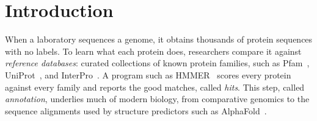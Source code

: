 \documentclass[letterpaper,twocolumn,10pt]{article}
\theoremstyle{definition}
\newcommand{\sys}{TARE\xspace}
\newcommand{\sys}{PARE\xspace}
\providecommand{\DIFadd}[1]{{\protect\color{blue} \sf #1}} %
\providecommand{\DIFaddbegin}{} %
\providecommand{\DIFaddend}{} %
\providecommand{\DIFaddincludegraphics}[2][]{{\color{blue}\fbox{\DIFOincludegraphics[#1]{#2}}}} %
\DeclareRobustCommand{\DIFaddbegin}{\DIFOaddbegin \let\includegraphics\DIFaddincludegraphics} %
\DeclareRobustCommand{\DIFaddend}{\DIFOaddend \let\includegraphics\DIFOincludegraphics} %
\begin{document}
\begin{abstract}
On Pfam updates, \sys is $4.24\times$ faster than a full rerun with a lightweight sampled audit (median of nine genomes
on a dedicated server; 95\% CI 4.17--4.68), and $\HeadlineBoundedMedian\times$ faster under the bounded-audit default
that carries the \DIFaddbegin \DIFadd{candidate}\nobreakdash\DIFadd{-population }\DIFaddend guarantee above (same nine genomes; 95\% CI \HeadlineBoundedCIlow--\HeadlineBoundedCIhigh).
Across 715{,}704 output lines from HMMER and Infernal, not one differed from a full run. \sys refused DIAMOND,
whose first filter reads bytes of the neighboring database entry, and BLAST+, whose unpinned probe rows fit none of
\sys's column rules.
\end{abstract}

\section{Introduction}
\label{sec:intro}

When a laboratory sequences a genome, it obtains thousands of protein sequences with no labels. To learn what
each protein does, researchers compare it against \textit{reference databases}: curated collections of known
protein families, such as Pfam~\cite{pfam2025}, UniProt~\cite{uniprot2025}, and InterPro~\cite{paysanlafosse2023interpro}.
A program such as HMMER~\cite{eddy2011hmmer} scores every protein against every family and reports the good
matches, called \textit{hits}. This step, called \textit{annotation}, underlies much of modern biology, from
comparative genomics to the sequence alignments used by structure predictors such as AlphaFold~\cite{jumper2021alphafold}.
\end{document}
